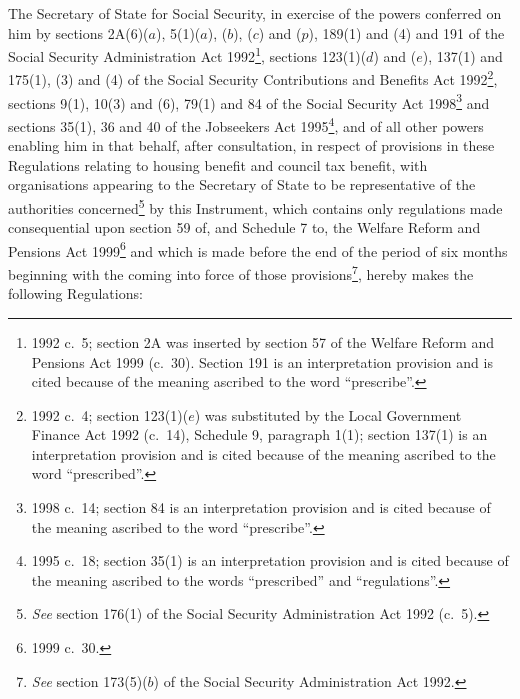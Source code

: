 \documentclass[12pt,a4paper]{article}
\title{\regstitle}
\author{S.I. 2000 No. 1982}
\date{Made
24th July 2000\\
Laid before Parliament
27th July 2000\\
Coming into force
19th March 2001
}
\begin{document}
\maketitle

\noindent
The Secretary of State for Social Security, in exercise of the powers conferred on him by sections 2A(6)($a$), 5(1)($a$), ($b$), ($c$)  and ($p$), 189(1) and (4) and 191 of the Social Security Administration Act 1992\footnote{1992 c.\ 5; section 2A was inserted by section 57 of the Welfare Reform and Pensions Act 1999 (c.\ 30). Section 191 is an interpretation provision and is cited because of the meaning ascribed to the word “prescribe”.}, sections 123(1)($d$)  and ($e$), 137(1) and 175(1), (3) and (4) of the Social Security Contributions and Benefits Act 1992\footnote{1992 c.\ 4; section 123(1)($e$) was substituted by the Local Government Finance Act 1992 (c.\ 14), Schedule 9, paragraph 1(1); section 137(1) is an interpretation provision and is cited because of the meaning ascribed to the word “prescribed”.}, sections 9(1), 10(3) and (6), 79(1) and 84 of the Social Security Act 1998\footnote{1998 c.\ 14; section 84 is an interpretation provision and is cited because of the meaning ascribed to the word “prescribe”.} and sections 35(1), 36 and 40 of the Jobseekers Act 1995\footnote{1995 c.\ 18; section 35(1) is an interpretation provision and is cited because of the meaning ascribed to the words “prescribed” and “regulations”.}, and of all other powers enabling him in that behalf, after consultation, in respect of provisions in these Regulations relating to housing benefit and council tax benefit, with organisations appearing to the Secretary of State to be representative of the authorities concerned\footnote{\emph{See} section 176(1) of the Social Security Administration Act 1992 (c.\ 5).} by this Instrument, which contains only regulations made consequential upon section 59 of, and Schedule 7 to, the Welfare Reform and Pensions Act 1999\footnote{1999 c.\ 30.} and which is made before the end of the period of six months beginning with the coming into force of those provisions\footnote{\emph{See} section 173(5)($b$) of the Social Security Administration Act 1992.}, hereby makes the following Regulations: 

\enlargethispage{\baselineskip}

{\sloppy

\tableofcontents

}

\bigskip

\setcounter{secnumdepth}{-2}
\end{document}
